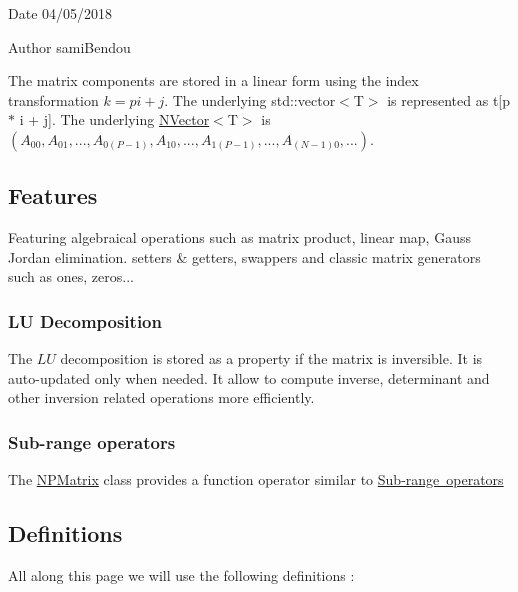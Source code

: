 \begin{DoxyDate}{Date}
04/05/2018 
\end{DoxyDate}
\begin{DoxyAuthor}{Author}
sami\+Bendou
\end{DoxyAuthor}
The matrix components are stored in a linear form using the index transformation $ k = p i + j $. The underlying {\ttfamily std\+::vector$<$T$>$} is represented as {\ttfamily t\mbox{[}p $\ast$ i + j\mbox{]}}. The underlying {\ttfamily \mbox{\hyperlink{class_n_vector}{N\+Vector}}$<$T$>$} is $ (A_{00}, A_{01}, ..., A_{0(P - 1)}, A_{10}, ..., A_{1(P - 1)}, ..., A_{(N-1)0}, ...) $.\hypertarget{class_n_vector_Features}{}\subsection{Features}\label{class_n_vector_Features}
Featuring algebraical operations such as matrix product, linear map, Gauss Jordan elimination. setters \& getters, swappers and classic matrix generators such as ones, zeros...\hypertarget{class_n_p_matrix_LUDecomp}{}\subsubsection{L\+U Decomposition}\label{class_n_p_matrix_LUDecomp}
The $ LU $ decomposition is stored as a property if the matrix is inversible. It is auto-\/updated only when needed. It allow to compute inverse, determinant and other inversion related operations more efficiently.\hypertarget{class_n_p_matrix_FuncOp}{}\subsubsection{Sub-\/range operators}\label{class_n_p_matrix_FuncOp}
The {\ttfamily \mbox{\hyperlink{class_n_p_matrix}{N\+P\+Matrix}}} class provides a function operator similar to \mbox{\hyperlink{class_n_vector_FuncOpVec}{Sub-\/range operators}}\hypertarget{class_n_vector_Definitions}{}\subsection{Definitions}\label{class_n_vector_Definitions}
All along this page we will use the following definitions \+:
